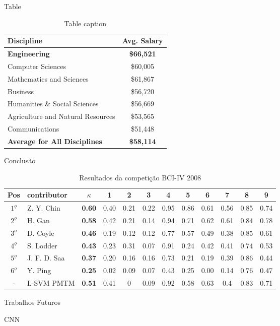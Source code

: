 \documentclass{beamer}
\begin{document}
\begin{frame}{Table}
	\begin{table}
		\centering %
		\begin{tabular}{l c}
			\toprule
			Discipline & Avg. Salary \\
			\toprule
			\textbf{Engineering} & \textbf{\$66,521} \\
			Computer Sciences & \$60,005\\
			Mathematics and Sciences & \$61,867\\
			Business & \$56,720\\
			Humanities \& Social Sciences & \$56,669\\
			Agriculture and Natural Resources & \$53,565\\
			Communications & \$51,448\\
			\midrule
			\textbf{Average for All Disciplines} & \textbf{\$58,114}\\
			\bottomrule
		\end{tabular}
	\caption{Table caption}
	\end{table}
\end{frame}
\begin{frame}{Conclus\~ao}
\color{BLACK}%
\tiny
\begin{table}[h!]
	\centering
	\caption{Resultados da competi\c{c}\~ao BCI-IV 2008}
	\begin{tabularx}{\textwidth}{c|X|c|c|c|c|c|c|c|c|c|c}		
		\hline\hline
		Pos&contributor&$\kappa$&1&2&3&4&5&6&7&8&9  \\ \hline
		$1^{\underline{o}}$&Z. Y. Chin&\textbf{0.60}&0.40&0.21&0.22&	0.95&0.86&0.61&0.56&0.85&0.74 \\ \hline 
		$2^{\underline{o}}$&H. Gan&\textbf{0.58}&0.42&0.21&0.14&0.94&0.71 &0.62&0.61&0.84&0.78 \\ \hline
		$3^{\underline{o}}$&D. Coyle&\textbf{0.46}&0.19&0.12&0.12 &0.77&0.57&0.49&0.38&0.85&0.61 \\ \hline
		$4^{\underline{o}}$&S. Lodder&\textbf{0.43}&0.23&0.31&0.07&0.91& 	0.24&0.42&0.41&0.74&0.53 \\ \hline
		$5^{\underline{o}}$&J. F. D. Saa&\textbf{0.37}&0.20&0.16&0.16&0.73&0.21&0.19&0.39&0.86&0.44 \\ \hline
		$6^{\underline{o}}$&Y. Ping&\textbf{0.25}&0.02&0.09&0.07&0.43&0.25&0.00&0.14&0.76&0.47\\ \hline\hline
		-&L-SVM PMTM&\textbf{0.51}&0.41&0&0.09&0.92&0.58&0.63&0.4&0.83&0.71\\ \hline
	\end{tabularx}
	\label{Tab:BCI2008}
\end{table}
\end{frame}
\begin{frame}{Trabalhos Futuros}

CNN
\end{frame}
\end{document}
